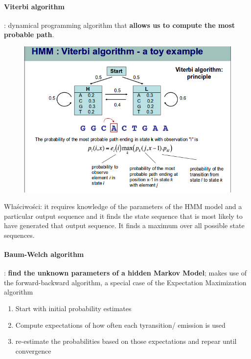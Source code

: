 \documentclass[10pt,a4paper]{article}
\begin{document}
\paragraph{Viterbi algorithm} : dynamical programming algorithm that \textbf{allows us to compute the most probable path}.
\begin{figure}[H]
  \centering
    \includegraphics[scale=0.50]{images/viterbi.png}
\end{figure}
Właściwości: it requires knowledge of the parameters of the HMM model and a particular output sequence and it finds the state sequence that is most likely to have generated that output sequence. It finds a maximum over all possible state sequences.
\paragraph{Baum-Welch algorithm} : \textbf{find the unknown parameters of a hidden Markov Model}; makes use of the forward-backward algorithm, a special case of the Expectation Maximization algorithm
  \begin{enumerate}
    \item Start with initial probability estimates
    \item Compute expectations of how often each tyransition/ emission is used
    \item re-estimate the probabilities based on those expectations and repear until convergence
  \end{enumerate}
\end{document}
